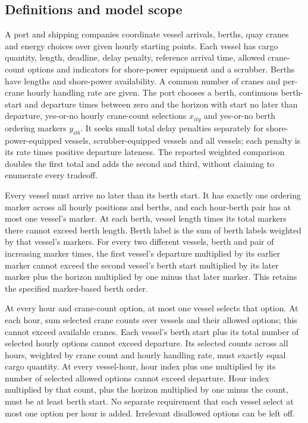 \documentclass[10pt]{article}
\begin{document}
\subsection*{Definitions and model scope}
A port and shipping companies coordinate vessel arrivals, berths, quay cranes and energy choices over given hourly starting points. Each vessel has cargo quantity, length, deadline, delay penalty, reference arrival time, allowed crane-count options and indicators for shore-power equipment and a scrubber. Berths have lengths and shore-power availability. A common number of cranes and per-crane hourly handling rate are given. The port chooses a berth, continuous berth-start and departure times between zero and the horizon with start no later than departure, yes-or-no hourly crane-count selections $x_{itq}$ and yes-or-no berth ordering markers $y_{itb}$. It seeks small total delay penalties separately for shore-power-equipped vessels, scrubber-equipped vessels and all vessels; each penalty is its rate times positive departure lateness. The reported weighted comparison doubles the first total and adds the second and third, without claiming to enumerate every tradeoff.

Every vessel must arrive no later than its berth start. It has exactly one ordering marker across all hourly positions and berths, and each hour-berth pair has at most one vessel's marker. At each berth, vessel length times its total markers there cannot exceed berth length. Berth label is the sum of berth labels weighted by that vessel's markers. For every two different vessels, berth and pair of increasing marker times, the first vessel's departure multiplied by its earlier marker cannot exceed the second vessel's berth start multiplied by its later marker plus the horizon multiplied by one minus that later marker. This retains the specified marker-based berth order.

At every hour and crane-count option, at most one vessel selects that option. At each hour, sum selected crane counts over vessels and their allowed options; this cannot exceed available cranes. Each vessel's berth start plus its total number of selected hourly options cannot exceed departure. Its selected counts across all hours, weighted by crane count and hourly handling rate, must exactly equal cargo quantity. At every vessel-hour, hour index plus one multiplied by its number of selected allowed options cannot exceed departure. Hour index multiplied by that count, plus the horizon multiplied by one minus the count, must be at least berth start. No separate requirement that each vessel select at most one option per hour is added. Irrelevant disallowed options can be left off.
\end{document}
